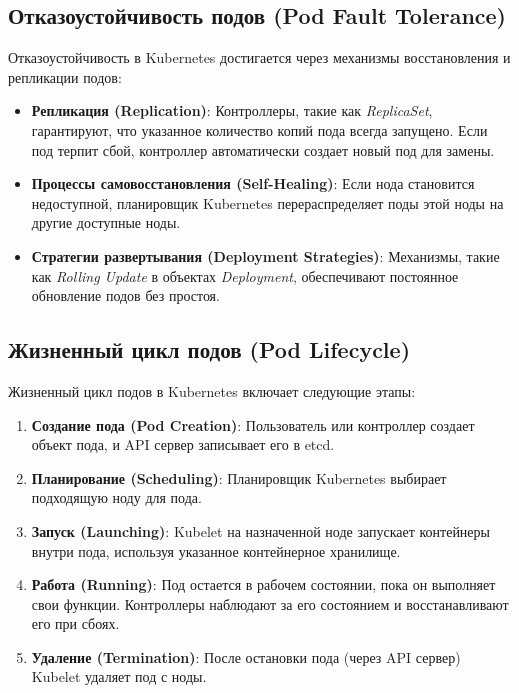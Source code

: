 \subsection*{Отказоустойчивость подов (Pod Fault Tolerance)}

Отказоустойчивость в Kubernetes достигается через механизмы восстановления и
репликации подов:

\begin{itemize}
    \item \textbf{Репликация (Replication)}: Контроллеры, такие как
\textit{ReplicaSet}, гарантируют, что указанное количество копий пода всегда
запущено. Если под терпит сбой, контроллер автоматически создает новый под для
замены.
    \item \textbf{Процессы самовосстановления (Self-Healing)}: Если нода
становится недоступной, планировщик Kubernetes перераспределяет поды этой ноды
на другие доступные ноды.
    \item \textbf{Стратегии развертывания (Deployment Strategies)}: Механизмы,
такие как \textit{Rolling Update} в объектах \textit{Deployment}, обеспечивают
постоянное обновление подов без простоя.
\end{itemize}

\subsection*{Жизненный цикл подов (Pod Lifecycle)}

Жизненный цикл подов в Kubernetes включает следующие этапы:

\begin{enumerate}
    \item \textbf{Создание пода (Pod Creation)}: Пользователь или контроллер
создает объект пода, и API сервер записывает его в etcd.
    \item \textbf{Планирование (Scheduling)}: Планировщик Kubernetes выбирает
подходящую ноду для пода.
    \item \textbf{Запуск (Launching)}: Kubelet на назначенной ноде запускает
контейнеры внутри пода, используя указанное контейнерное хранилище.
    \item \textbf{Работа (Running)}: Под остается в рабочем состоянии, пока он
выполняет свои функции. Контроллеры наблюдают за его состоянием и
восстанавливают его при сбоях.
    \item \textbf{Удаление (Termination)}: После остановки пода (через API
сервер) Kubelet удаляет под с ноды.
\end{enumerate}

